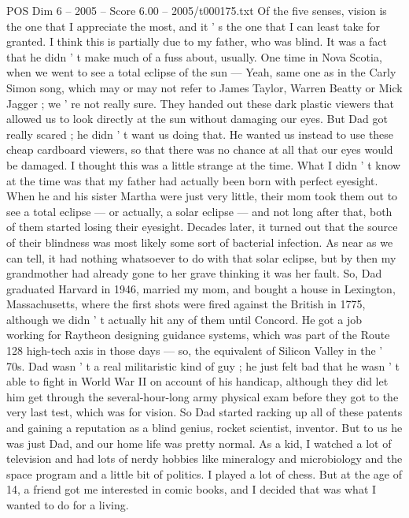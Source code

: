 \begin{textsample}{POS Dim 6 – 2005 – Score 6.00 – 2005/t000175.txt}  \label{ex:f6_pos_002}
Of the five senses, vision is the one that I appreciate the most, and it ' s the one that I can least take for granted.
I think this is partially due to my father, who was blind.
It was a fact that he didn ' t make much of a fuss about, usually.
One time in Nova Scotia, when we went to see a total eclipse of the sun — Yeah, same one as in the Carly Simon song, which may or may not refer to James Taylor, Warren Beatty or Mick Jagger ; we ' re not really sure.
They handed out these dark plastic viewers that allowed us to look directly at the sun without damaging our eyes.
But Dad got really scared ; he didn ' t want us doing that.
He wanted us instead to use these cheap cardboard viewers, so that there was no chance at all that our eyes would be damaged.
I thought this was a little strange at the time.
What I didn ' t know at the time was that my father had actually been born with perfect eyesight.
When he and his sister Martha were just very little, their mom took them out to see a total eclipse — or actually, a solar eclipse — and not long after that, both of them started losing their eyesight.
Decades later, it turned out that the source of their blindness was most likely some sort of bacterial infection.
As near as we can tell, it had nothing whatsoever to do with that solar eclipse, but by then my grandmother had already gone to her grave thinking it was her fault.
So, Dad graduated Harvard in 1946, married my mom, and bought a house in Lexington, Massachusetts, where the first shots were fired against the British in 1775, although we didn ' t actually hit any of them until Concord.
He got a job working for Raytheon designing guidance systems, which was part of the Route 128 high-tech axis in those days — so, the equivalent of Silicon Valley in the ' 70s.
Dad wasn ' t a real militaristic kind of guy ; he just felt bad that he wasn ' t able to fight in World War II on account of his handicap, although they did let him get through the several-hour-long army physical exam before they got to the very last test, which was for vision.
So Dad started racking up all of these patents and gaining a reputation as a blind genius, rocket scientist, inventor.
But to us he was just Dad, and our home life was pretty normal.
As a kid, I watched a lot of television and had lots of nerdy hobbies like mineralogy and microbiology and the space program and a little bit of politics.
I played a lot of chess.
But at the age of 14, a friend got me interested in comic books, and I decided that was what I wanted to do for a living.

\end{textsample}
